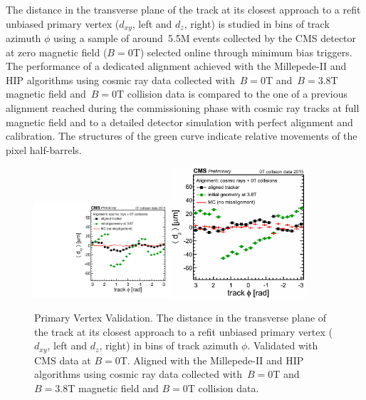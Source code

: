 The distance in the transverse plane of the track at its closest approach to a refit unbiased primary vertex ($d_{xy}$, left and $d_{z}$, right) is studied in bins of track azimuth $\phi$ using a sample of around~5.5M events collected by the CMS detector at zero magnetic field ($B=0$T) selected online through minimum bias triggers. The performance of a dedicated alignment achieved with the Millepede-II and HIP algorithms using cosmic ray data collected with~$B=0$T and~$B=3.8$T magnetic field and~$B=0$T collision data is compared to the one of a previous alignment reached during the commissioning phase with cosmic ray tracks at full magnetic field and to a detailed detector simulation with perfect alignment and calibration. The structures of the green curve indicate relative movements of the pixel half-barrels.

\begin{figure}[htb]
    \begin{center}
        \includegraphics[width=0.45\textwidth]{../figs/Alignment/AlRes_dxyPhiBiasCanvas.pdf}\includegraphics[width=0.45\textwidth]{../figs/Alignment/AlRes_dzPhiBiasCanvas.png}
    \end{center}
    \caption{Primary Vertex Validation. The distance in the transverse plane of the track at its closest approach to a refit unbiased primary vertex ($d_{xy}$, left and $d_z$, right) in bins of track azimuth $\phi$. Validated with CMS data at $B=0$T. Aligned with the Millepede-II and HIP algorithms using cosmic ray data collected with~$B=0$T and~$B=3.8$T magnetic field and $B=0$T collision data. }
    \label{fig:PVvalidation}
\end{figure}




